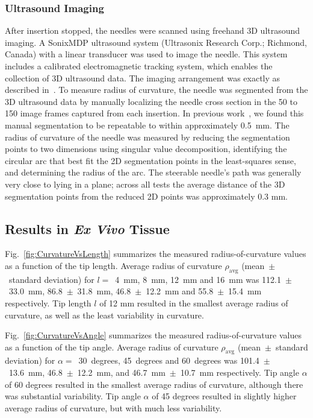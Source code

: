 \subsubsection{Ultrasound Imaging}
After insertion stopped, the needles were scanned using freehand 3D ultrasound imaging. A SonixMDP ultrasound system (Ultrasonix Research Corp.; Richmond, Canada) with a linear transducer was used to image the needle. This system includes a calibrated electromagnetic tracking system, which enables the collection of 3D ultrasound data. The imaging arrangement was exactly as described in~\cite{Greer2014}. To measure radius of curvature, the needle was segmented from the 3D ultrasound data by manually localizing the needle cross section in the 50 to 150 image frames captured from each insertion. In previous work~\cite{Adebar2014}, we found this manual segmentation to be repeatable to within approximately 0.5~mm. The radius of curvature of the needle was measured by reducing the segmentation points to two dimensions using singular value decomposition, identifying the circular arc that best fit the 2D segmentation points in the least-squares sense, and determining the radius of the arc. The steerable needle's path was generally very close to lying in a plane; across all tests the average distance of the 3D segmentation points from the reduced 2D points was approximately 0.3 mm.

\subsection{Results in \textit{Ex Vivo} Tissue}
Fig.~\ref{fig:CurvatureVsLength} summarizes the measured radius-of-curvature values as a function of the tip length. Average radius of curvature $\rho_{\text{avg}}$ (mean~$\pm$~standard deviation) for $l =$~4~mm, 8~mm, 12~mm and 16~mm was 112.1~$\pm$~33.0~mm, 86.8~$\pm$~31.8~mm, 46.8~$\pm$~12.2~mm and 55.8~$\pm$~15.4~mm respectively. Tip length $l$ of 12 mm resulted in the smallest average radius of curvature, as well as the least variability in curvature. 

Fig.~\ref{fig:CurvatureVsAngle} summarizes the measured radius-of-curvature values as a function of the tip angle. Average radius of curvature $\rho_{\text{avg}}$ (mean~$\pm$~standard deviation) for $\alpha =$~30~degrees, 45~degrees and 60~degrees was 101.4~$\pm$~13.6~mm, 46.8~$\pm$~12.2~mm, and 46.7~mm~$\pm$~10.7~mm respectively. Tip angle $\alpha$ of 60 degrees resulted in the smallest average radius of curvature, although there was substantial variability. Tip angle $\alpha$ of 45 degrees resulted in slightly higher average radius of curvature, but with much less variability.

